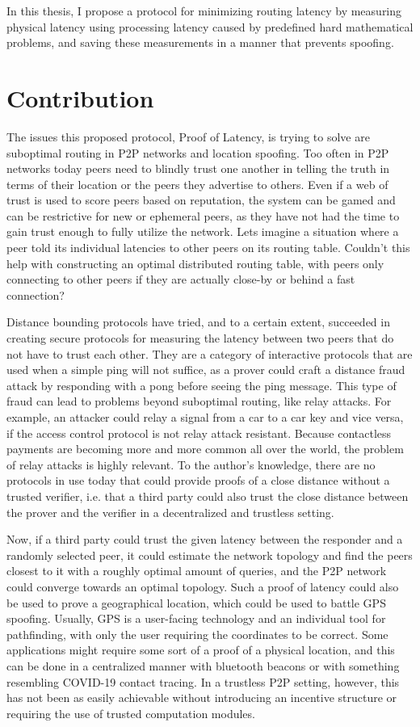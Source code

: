 In this thesis, I propose a protocol for minimizing routing latency by measuring physical latency using processing latency caused by predefined hard mathematical problems, and saving these measurements in a manner that prevents spoofing.

\section{Contribution}
The issues this proposed protocol, Proof of Latency, is trying to solve are suboptimal routing in P2P networks and location spoofing. Too often in P2P networks today peers need to blindly trust one another in telling the truth in terms of their location or the peers they advertise to others. Even if a web of trust is used to score peers based on reputation, the system can be gamed and can be restrictive for new or ephemeral peers, as they have not had the time to gain trust enough to fully utilize the network. Lets imagine a situation where a peer told its individual latencies to other peers on its routing table. Couldn't this help with constructing an optimal distributed routing table, with peers only connecting to other peers if they are actually close-by or behind a fast connection?

Distance bounding protocols have tried, and to a certain extent, succeeded in creating secure protocols for measuring the latency between two peers that do not have to trust each other. They are a category of interactive protocols that are used when a simple ping will not suffice, as a prover could craft a distance fraud attack by responding with a pong before seeing the ping message. This type of fraud can lead to problems beyond suboptimal routing, like relay attacks. For example, an attacker could relay a signal from a car to a car key and vice versa, if the access control protocol is not relay attack resistant. Because contactless payments are becoming more and more common all over the world, the problem of relay attacks is highly relevant. To the author's knowledge, there are no protocols in use today that could provide proofs of a close distance without a trusted verifier, i.e. that a third party could also trust the close distance between the prover and the verifier in a decentralized and trustless setting.

Now, if a third party could trust the given latency between the responder and a randomly selected peer, it could estimate the network topology and find the peers closest to it with a roughly optimal amount of queries, and the P2P network could converge towards an optimal topology. Such a proof of latency could also be used to prove a geographical location, which could be used to battle GPS spoofing. Usually, GPS is a user-facing technology and an individual tool for pathfinding, with only the user requiring the coordinates to be correct. Some applications might require some sort of a proof of a physical location, and this can be done in a centralized manner with bluetooth beacons or with something resembling COVID-19 contact tracing. In a trustless P2P setting, however, this has not been as easily achievable without introducing an incentive structure or requiring the use of trusted computation modules.


